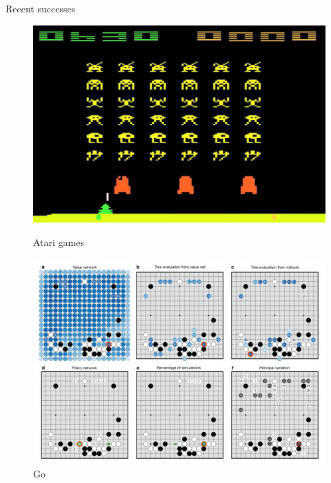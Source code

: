 \documentclass{beamer}
\begin{document}

\begin{frame}{Recent successes}
\begin{figure}
    \centering
    \begin{minipage}{0.45\textwidth}
        \centering
        \includegraphics[width=0.87\linewidth]{../gfx/space_invaders.jpg}
        \caption{Atari games}
    \end{minipage}\hfill
    \begin{minipage}{0.45\textwidth}
        \centering
        \includegraphics[width=\linewidth]{../gfx/alphago.jpg}
        \caption{Go}
    \end{minipage}
\end{figure}

\end{frame}

\end{document}
